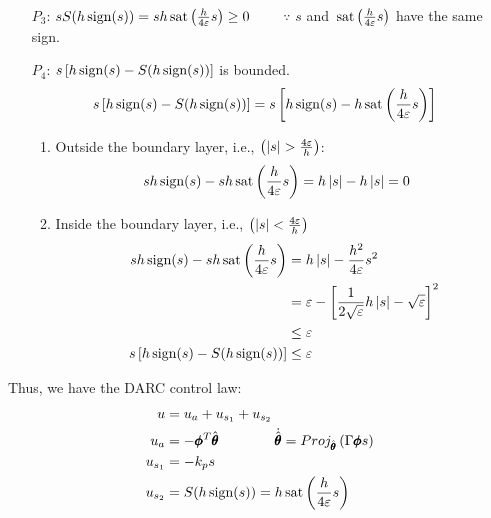 \begin{itemize}
\item[$P_3$:] $s S(h \,\text{sign}(s)) = s h \,\text{sat} \left( \frac{h}{4 \varepsilon} s \right) \geq
0 \qquad $ $\because$ $s$ and $\,\text{sat} \left( \frac{h}{4 \varepsilon} s \right)$ have the
same sign.

\item[$P_4$:] $s \left[h \,\text{sign}(s) - S(h\,\text{sign}(s)) \right]$ is bounded.
\begin{align*}
    s \left[h \,\text{sign}(s) - S(h\,\text{sign}(s)) \right] &= s \left[h \,\text{sign}(s) - h \,\text{sat} \left( \frac{h}{4 \varepsilon} s \right) \right]
\end{align*}
\begin{enumerate}
\item Outside the boundary layer, i.e., $\left( \left\lvert s \right\rvert > \frac{4 \varepsilon}{h}
 \right)$:
\begin{align*}
    sh \,\text{sign}(s) - s h \,\text{sat} \left( \frac{h}{4 \varepsilon} s \right) &= h \left\lvert s \right\rvert - h\left\lvert s \right\rvert = 0
\end{align*}

\item Inside the boundary layer, i.e., $\left( \left\lvert s \right\rvert < \frac{4 \varepsilon}{h} \right)$
\begin{align*}
    sh \,\text{sign}(s) - s h \,\text{sat} \left( \frac{h}{4 \varepsilon} s \right) &= h \left\lvert s \right\rvert - \frac{h^2}{4 \varepsilon} s^2\\
    &= \varepsilon - \left[ \frac{1}{2 \sqrt{\varepsilon}} h \left\lvert s \right\rvert - \sqrt{\varepsilon} \right]^2\\
    &\leq \varepsilon\\
    s \left[h \,\text{sign}(s) - S(h\,\text{sign}(s)) \right] &\leq \varepsilon
\end{align*}
\end{enumerate}
\end{itemize}

Thus, we have the DARC control law:
\begin{align*}
    u &= u_a + u_{s_1} + u_{s_2}\\
    u_a &= - \pmb \phi^T \hat{\pmb \theta} \qquad  \qquad
    \dot{\hat{\pmb \theta}} = Proj_{\hat{\pmb \theta}} \left( \Gamma \pmb \phi s \right)\\
    u_{s_1} &= -k_p s\\
    u_{s_2} &= S(h \,\text{sign}(s)) = h \,\text{sat} \left( \frac{h}{4 \varepsilon} s \right)
\end{align*}
